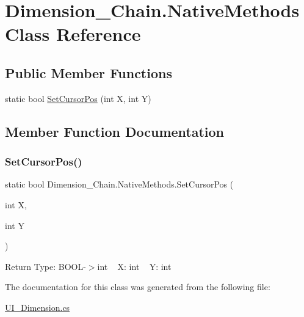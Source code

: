 \hypertarget{class_dimension___chain_1_1_native_methods}{}\section{Dimension\+\_\+\+Chain.\+Native\+Methods Class Reference}
\label{class_dimension___chain_1_1_native_methods}
\subsection*{Public Member Functions}
\begin{DoxyCompactItemize}
\item 
static bool \mbox{\hyperlink{class_dimension___chain_1_1_native_methods_ab0debd810a872bbc9c47448dd23c0ff3}{Set\+Cursor\+Pos}} (int X, int Y)
\end{DoxyCompactItemize}


\subsection{Member Function Documentation}
\mbox{\label{class_dimension___chain_1_1_native_methods_ab0debd810a872bbc9c47448dd23c0ff3}} 
\subsubsection{\texorpdfstring{Set\+Cursor\+Pos()}{SetCursorPos()}}
{\footnotesize\ttfamily static bool Dimension\+\_\+\+Chain.\+Native\+Methods.\+Set\+Cursor\+Pos (\begin{DoxyParamCaption}\item[{int}]{X,  }\item[{int}]{Y }\end{DoxyParamCaption})}

Return Type\+: B\+O\+O\+L-\/$>$int ~\newline
X\+: int ~\newline
Y\+: int 

The documentation for this class was generated from the following file\+:\begin{DoxyCompactItemize}
\item 
\mbox{\hyperlink{_u_i___dimension_8cs}{U\+I\+\_\+\+Dimension.\+cs}}\end{DoxyCompactItemize}
